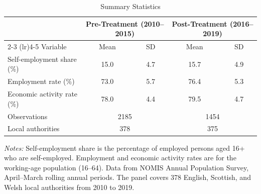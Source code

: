 
\begin{table}[htbp]
\centering
\caption{Summary Statistics}
\label{tab:summary}
\begin{tabular}{lcccc}
\toprule
& \multicolumn{2}{c}{Pre-Treatment (2010--2015)} & \multicolumn{2}{c}{Post-Treatment (2016--2019)} \\
\cmidrule(lr){2-3} \cmidrule(lr){4-5}
Variable & Mean & SD & Mean & SD \\
\midrule
Self-employment share (\%) & 15.0 & 4.7 & 15.7 & 4.9 \\
Employment rate (\%) & 73.0 & 5.7 & 76.4 & 5.3 \\
Economic activity rate (\%) & 78.0 & 4.4 & 79.5 & 4.7 \\
\midrule
Observations & \multicolumn{2}{c}{2185} & \multicolumn{2}{c}{1454} \\
Local authorities & \multicolumn{2}{c}{378} & \multicolumn{2}{c}{375} \\
\bottomrule
\end{tabular}
\begin{tablenotes}
\small
\item \textit{Notes:} Self-employment share is the percentage of employed persons aged 16+ who are self-employed. Employment and economic activity rates are for the working-age population (16--64). Data from NOMIS Annual Population Survey, April--March rolling annual periods. The panel covers 378 English, Scottish, and Welsh local authorities from 2010 to 2019.
\end{tablenotes}
\end{table}

